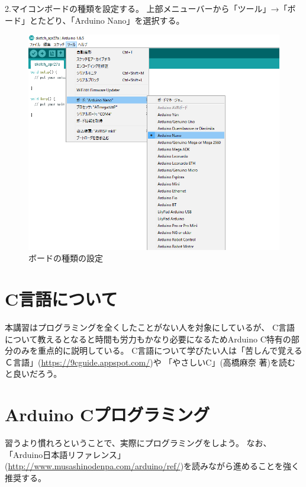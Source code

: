 \documentclass[uplatex]{jsarticle}
\begin{document}
2.マイコンボードの種類を設定する。
上部メニューバーから「ツール」→「ボード」とたどり、「Arduino Nano」を選択する。
\begin{figure}[htbp]
    \centering
    \includegraphics[width=13cm]{board_config.png}
    \caption{ボードの種類の設定}
\end{figure}

\section{C言語について}
本講習はプログラミングを全くしたことがない人を対象にしているが、
C言語について教えるとなると時間も労力もかなり必要になるためArduino C特有の部分のみを重点的に説明している。
C言語について学びたい人は「苦しんで覚えるＣ言語」(\url{https://9cguide.appspot.com/})や
「やさしいC」(高橋麻奈 著)を読むと良いだろう。
\clearpage
\section{Arduino Cプログラミング}
習うより慣れろということで、実際にプログラミングをしよう。
なお、「Arduino日本語リファレンス」(\url{http://www.musashinodenpa.com/arduino/ref/})を読みながら進めることを強く推奨する。
\end{document}
